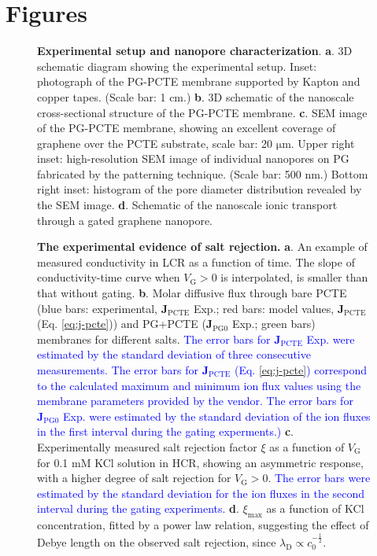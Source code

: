 \clearpage
\section{Figures}
\label{sec:figs}

\begin{figure}[H]
  \centering
  \caption{\textbf{Experimental setup and nanopore characterization}.
    \textbf{a}. 3D schematic diagram showing the experimental
    setup. Inset: photograph of the PG-PCTE membrane supported by
    Kapton and copper tapes. (Scale bar: 1 cm.) \textbf{b}. 3D schematic
    of the nanoscale cross-sectional structure of the PG-PCTE
    membrane. \textbf{c}. SEM image of the PG-PCTE membrane, showing an
    excellent coverage of graphene over the PCTE substrate, scale bar:
    20 $\mathrm{\mu}$m.  Upper right inset: high-resolution SEM image
    of individual nanopores on PG fabricated by the patterning
    technique. (Scale bar: 500 nm.) Bottom right inset: histogram of the
    pore diameter distribution revealed by the SEM
    image. \textbf{d}. Schematic of the nanoscale ionic transport
    through a gated graphene nanopore.}
  \label{fig:1}
\end{figure}

\begin{figure}[H]
  \centering
  \caption{ \textbf{The experimental evidence of salt rejection.}
    \textbf{a}. An example of measured conductivity in LCR as a
    function of time. The slope of conductivity-time curve when
    $V_{\mathrm{G}}>0$ is interpolated, is smaller than that without
    gating. \textbf{b}. Molar diffusive flux through bare PCTE (blue
    bars: experimental, $\boldsymbol{J}_{\mathrm{PCTE}}$ Exp.; red
    bars: model values, $\boldsymbol{J}_{\mathrm{PCTE}}$
    (Eq. \ref{eq:j-pcte})) and PG+PCTE
    ($\boldsymbol{J}_{\mathrm{PG0}}$ Exp.; green bars) membranes for
    different salts. \textcolor{blue}{The error bars for
      $\boldsymbol{J}_{\mathrm{PCTE}}$ Exp. were estimated by the
      standard deviation of three consecutive measurements. The error bars
      for $\boldsymbol{J}_{\mathrm{PCTE}}$ (Eq. \ref{eq:j-pcte})
      correspond to the calculated maximum and minimum ion flux values
      using the membrane parameters provided by the vendor. The error
      bars for $\boldsymbol{J}_{\mathrm{PG0}}$ Exp. were estimated by
      the standard deviation of the ion fluxes in the first interval
      during the gating experments.)}  \textbf{c}. Experimentally
    measured salt rejection factor $\xi$ as a function of
    $V_{\mathrm{G}}$ for 0.1 mM KCl solution in HCR, showing an
    asymmetric response, with a higher degree of salt rejection for
    $V_{\mathrm{G}}>0$. \textcolor{blue}{The error bars were estimated
      by the standard deviation for the ion fluxes in the second
      interval during the gating experiments.}
    \textbf{d}. $\xi_{\mathrm{max}}$ as a function of KCl
    concentration, fitted by a power law relation, suggesting the
    effect of Debye length on the observed salt rejection, since
    $\lambda_{\mathrm{D}} \propto c_{0}^{-\frac{1}{2}}$.}
  \label{fig:2} 
\end{figure}

